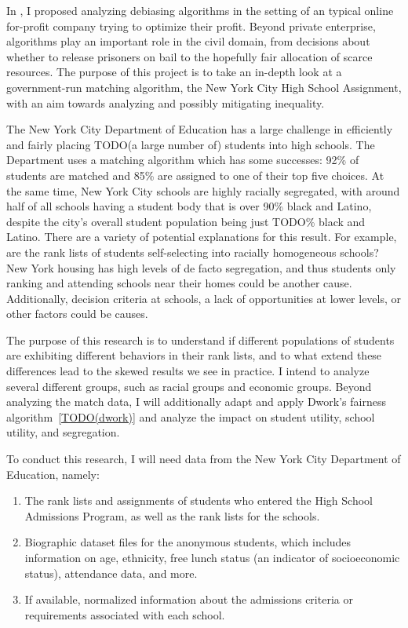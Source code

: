 
In , I proposed analyzing debiasing algorithms in the setting of an typical online for-profit company trying to optimize their profit.
Beyond private enterprise, algorithms play an important role in the civil domain, from decisions about whether to release prisoners on bail to the hopefully fair allocation of scarce resources.
The purpose of this project is to take an in-depth look at a government-run matching algorithm, the New York City High School Assignment, with an aim towards analyzing and possibly mitigating inequality.

The New York City Department of Education has a large challenge in efficiently and fairly placing TODO(a large number of) students into high schools.
The Department uses a matching algorithm which has some successes: 92\% of students are matched and 85\% are assigned to one of their top five choices.
At the same time, New York City schools are highly racially segregated, with around half of all schools having a student body that is over 90\% black and Latino, despite the city's overall student population being just TODO\% black and Latino.
There are a variety of potential explanations for this result.
For example, are the rank lists of students self-selecting into racially homogeneous schools?
New York housing has high levels of de facto segregation, and thus students only ranking and attending schools near their homes could be another cause.
Additionally, decision criteria at schools, a lack of opportunities at lower levels, or other factors could be causes.

The purpose of this research is to understand if different populations of students are exhibiting different behaviors in their rank lists, and to what extend these differences lead to the skewed results we see in practice.
I intend to analyze several different groups, such as racial groups and economic groups.
Beyond analyzing the match data, I will additionally adapt and apply Dwork's fairness algorithm~\ref{TODO(dwork)} and analyze the impact on student utility, school utility, and segregation.

To conduct this research, I will need data from the New York City Department of Education, namely:
\begin{enumerate}
  \item The rank lists and assignments of students who entered the High School Admissions Program, as well as the rank lists for the schools.
  \item Biographic dataset files for the anonymous students, which includes information on age, ethnicity, free lunch status (an indicator of socioeconomic status), attendance data, and more.
  \item If available, normalized information about the admissions criteria or requirements associated with each school.
\end{enumerate}

